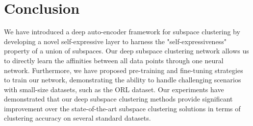 \documentclass{article}
\begin{document}
\section{Conclusion}

We have introduced a deep auto-encoder framework for subspace clustering by developing a novel self-expressive layer to harness the "self-expressiveness" property of a union of subspaces. Our deep subspace clustering network allows us to directly learn the affinities between all data points through one neural network. Furthermore, we have proposed pre-training and fine-tuning strategies to train our network, demonstrating the ability to handle challenging scenarios with small-size datasets, such as the ORL dataset. 
Our experiments have demonstrated that our deep subspace clustering methods provide significant improvement over the state-of-the-art subspace clustering solutions in terms of clustering accuracy on several standard datasets. 






{\small
 
}
\end{document}
